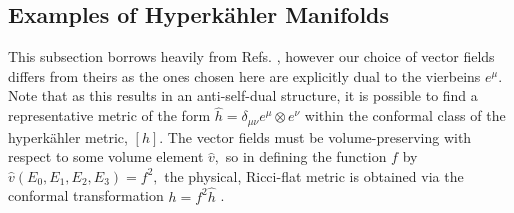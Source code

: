 \documentclass[a4paper,12pt, onecolumn, notitlepage]{article}
\theoremstyle{definition}
\theoremstyle{remark}
\newcommand{\m}{\mu}
\newcommand{\n}{\nu}
\newcommand{\HK}{hyperk\"ahler }
\begin{document}
\subsection{Examples of Hyperk\"ahler Manifolds}
This subsection borrows heavily from Refs. \cite{ootsuka_1998,joyce_1995}, however our choice of vector fields differs from theirs as the ones chosen here are explicitly dual to the vierbeins $e^{\m}$. Note that as this results in an anti-self-dual structure, it is possible to find a representative metric of the form $\hat{h}=\delta_{\m\n}e^{\m}\otimes e^{\n}$ within the conformal class of the \HK metric, $[h]$. The vector fields must be volume-preserving with respect to some volume element $\hat{v},$ so in defining the function $f$ by $\hat{v}(E_{0},E_{1},E_{2},E_{3}) = f^{2},$ the physical, Ricci-flat metric is obtained via the conformal transformation $h=f^{2}\hat{h}$ \cite{grant_1997}.\\
\end{document}
